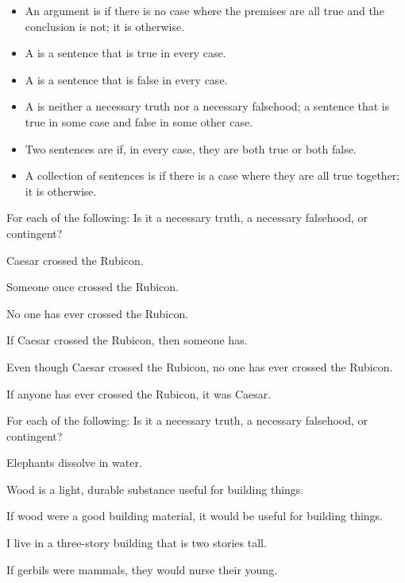 \begin{itemize}
\item An argument is  if there is no case where the premises are all true and the conclusion is not; it is  otherwise.

\item A  is a sentence that is true in every case.

\item A  is a sentence that is false in every case.

\item A  is neither a necessary truth nor a necessary falsehood; a sentence that is true in some case and false in some other case.

\item Two sentences are  if, in every case, they are both true or both false.

\item A collection of sentences is  if there is a case where they are all true together; it is  otherwise.
\end{itemize}


\practiceproblems
\problempart
\label{pr.EnglishTautology2}
For each of the following: Is it a necessary truth, a necessary falsehood, or contingent?
\begin{compactlist}
\item Caesar crossed the Rubicon.
\item Someone once crossed the Rubicon.
\item No one has ever crossed the Rubicon.
\item If Caesar crossed the Rubicon, then someone has.
\item Even though Caesar crossed the Rubicon, no one has ever crossed the Rubicon.
\item If anyone has ever crossed the Rubicon, it was Caesar.
\end{compactlist}

\problempart
For each of the following: Is it a necessary truth, a necessary falsehood, or contingent?
\begin{compactlist}
\item Elephants dissolve in water.
\item Wood is a light, durable substance useful for building things.
\item If wood were a good building material, it would be useful for building things.
\item I live in a three-story building that is two stories tall.
\item If gerbils were mammals, they would nurse their young.
\end{compactlist}


